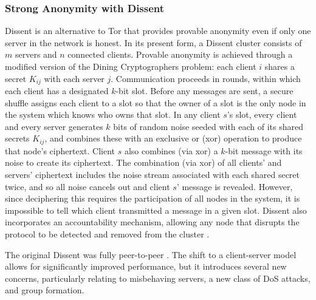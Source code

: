   \subsubsection{Strong Anonymity with Dissent}
    Dissent is an alternative to Tor that provides provable anonymity even if
    only one server in the network is honest\cite{p2pd}.
    In its present form, a Dissent cluster consists of $m$ servers and $n$
    connected clients\cite{din}. Provable anonymity is
    achieved through a modified version of the Dining Cryptographers
    problem\cite{chaum_dining_1988}: each client $i$ shares a secret $K_{ij}$
    with each server $j$. Communication proceeds in rounds, within which each
    client has a designated $k$-bit slot.  Before any messages are sent, a
    secure shuffle\cite{neff} assigns each client to a slot so
    that the owner of a slot is the only node in the system which knows who owns
    that slot.  In any client $s$'s slot, every client and every server
    generates $k$ bits of random noise seeded with each of its shared secrets
    $K_{ij}$, and combines these with an exclusive or (xor) operation to produce
    that node's ciphertext. Client $s$ also combines (via xor) a $k$-bit message
    with its noise to create its ciphertext. The combination (via xor) of all
    clients' and servers' ciphertext includes the noise stream associated with
    each shared secret twice, and so all noise cancels out and client $s$'
    message is revealed. However, since deciphering this requires the
    participation of all nodes in the system, it is impossible to tell which
    client transmitted a message in a given slot. Dissent also incorporates an
    accountability mechanism, allowing any node that disrupts the protocol to be
    detected and removed from the cluster
    \cite{verdict}.

    The original Dissent was fully peer-to-peer
    \cite{p2pd}. The shift to a client-server model
    allows for significantly improved performance, but it introduces several new
    concerns, particularly relating to misbehaving servers, a new class of DoS
    attacks, and group formation.

